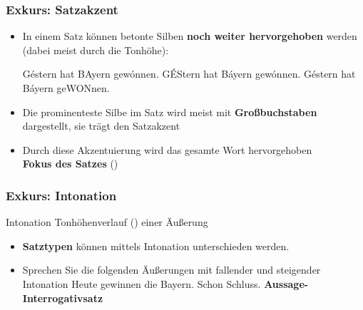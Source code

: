 \begin{frame}
\frametitle{Exkurs: Satzakzent}

\begin{itemize}
\item In einem Satz können betonte Silben \textbf{noch weiter hervorgehoben} werden (dabei meist durch die Tonhöhe):

\eal 
\ex Géstern hat BAyern gewónnen.
\ex GÉStern hat Báyern gewónnen.
\ex Géstern hat Báyern geWONnen.
\zl
\item Die prominenteste Silbe im Satz wird meist mit \textbf{Großbuchstaben} dargestellt, sie trägt den Satzakzent

\item Durch diese Akzentuierung wird das gesamte Wort
hervorgehoben \ras\\ \textbf{Fokus des Satzes} ()

\end{itemize}

\end{frame}




\begin{frame}
\frametitle{Exkurs: Intonation}

\begin{block}{Intonation}
Tonhöhenverlauf () einer Äußerung
\end{block}

\begin{itemize}
\item \textbf{Satztypen} können mittels Intonation unterschieden werden.

\item Sprechen Sie die folgenden Äußerungen mit fallender und steigender Intonation
\eal 
\ex Heute gewinnen die Bayern.
\ex Schon Schluss.
\zl
\pause
\textbf{Aussage-} \vs \textbf{Interrogativsatz}	

\end{itemize}

\end{frame}



